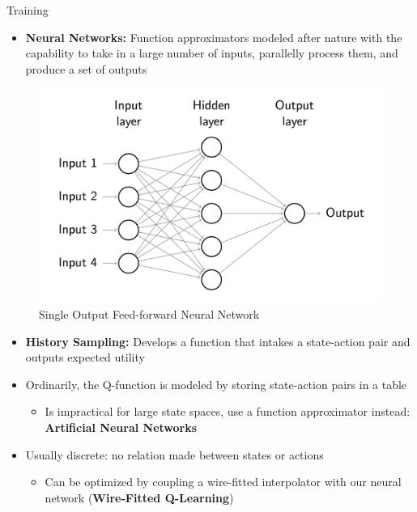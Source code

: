 \documentclass[final]{beamer}
\newlength{\onecolwid}
\newlength{\twocolwid}
\begin{document}
\begin{frame}[t]
\begin{columns}[t]
\begin{column}{\twocolwid}
\begin{columns}[t,totalwidth=\twocolwid]
	\begin{column}{\onecolwid}\begin{block}{Training}


	\begin{itemize}
		\item \textbf{Neural Networks:} Function approximators modeled after nature with the capability to take in a large number of inputs, parallelly process them, and produce a set of outputs
	\end{itemize}

	\begin{figure}
		\centering
		\includegraphics[width=.8\linewidth]{Figures/FeedForwardRendered}
		\caption{Single Output Feed-forward Neural Network}
		\label{fig:feedforward}
	\end{figure}

	\begin{itemize}
		\item \textbf{History Sampling:} Develops a function that intakes a state-action pair and outputs expected utility
		\item Ordinarily, the Q-function is modeled by storing state-action pairs in a table
		\begin{itemize}
			\item Is impractical for large state spaces, use a function approximator instead: \textbf{Artificial Neural Networks}
		\end{itemize}

		\item Usually discrete: no relation made between states or actions

		\begin{itemize}
			\item Can be optimized by coupling a wire-fitted interpolator with our neural network (\textbf{Wire-Fitted Q-Learning})
		\end{itemize}


\end{itemize}
\end{block}
\end{column}
\end{columns}
\end{column}
\end{columns}
\end{frame}
\end{document}
